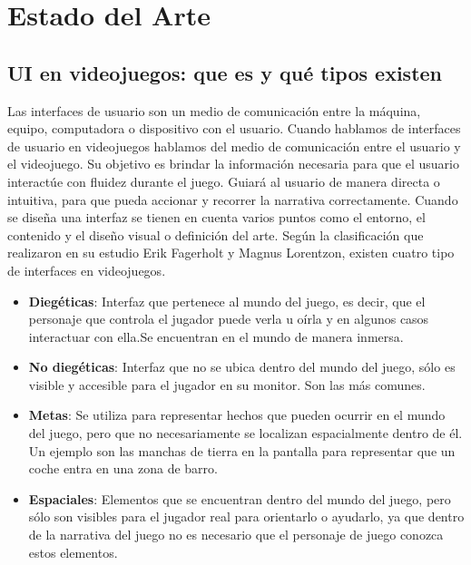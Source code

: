 \newpage
\section {Estado del Arte}
\subsection{UI en videojuegos: que es  y qué tipos existen}
Las interfaces de usuario son un medio de comunicación entre la máquina, equipo, computadora o dispositivo con el usuario. Cuando hablamos de interfaces de usuario en videojuegos hablamos del medio de comunicación entre el usuario y el videojuego. Su objetivo es brindar la información necesaria para que el usuario interactúe con fluidez durante el juego. Guiará al usuario de manera directa o intuitiva,  para que pueda accionar y recorrer la narrativa correctamente. Cuando se diseña una interfaz se tienen en cuenta varios puntos como el entorno, el contenido y el diseño visual o definición del arte. 
Según la clasificación que realizaron en su estudio\cite{HUD} Erik Fagerholt y Magnus Lorentzon, existen cuatro tipo de interfaces en videojuegos.
\begin{itemize}
\item  \textbf{Diegéticas}: Interfaz que pertenece al mundo del juego, es decir, que el personaje que controla el jugador puede verla u oírla  y en algunos casos interactuar con ella.Se encuentran en el mundo de manera inmersa.
\item \textbf{No diegéticas}: Interfaz que no se ubica dentro del mundo del juego, sólo es visible y accesible para el jugador en su monitor. Son las más comunes. 
\item \textbf{Metas}: Se utiliza para representar hechos que pueden ocurrir en el mundo del juego, pero que no necesariamente se localizan espacialmente dentro de él. Un ejemplo son las manchas de tierra en la pantalla para representar que un coche entra en una zona de barro.
\item \textbf{Espaciales}: Elementos que se encuentran dentro del mundo del juego, pero sólo son visibles para el jugador real para orientarlo o ayudarlo, ya que dentro de la narrativa del juego no es necesario que el personaje de juego conozca estos elementos.
\end{itemize}
